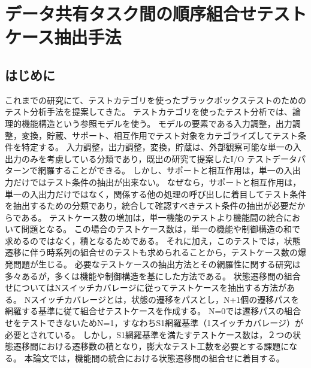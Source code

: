 \documentclass[a4paper,10pt]{jreport}
\begin{document}
\section{データ共有タスク間の順序組合せテストケース抽出手法}

\subsection{はじめに}
これまでの研究にて、テストカテゴリを使ったブラックボックステストのためのテスト分析手法を提案してきた。
テストカテゴリを使ったテスト分析では、論理的機能構造という参照モデルを使う。
モデルの要素である入力調整，出力調整，変換，貯蔵、サポート、相互作用でテスト対象をカテゴライズしてテスト条件を特定する。
入力調整，出力調整，変換，貯蔵は、外部観察可能な単一の入出力のみを考慮している分類であり，既出の研究て提案したI/O テストデータパターンで網羅することができる。
しかし、サポートと相互作用は，単一の入出力だけではテスト条件の抽出が出来ない。
なぜなら，サポートと相互作用は，単一の入出力だけではなく，関係する他の処理の呼び出しに着目してテスト条件を抽出するための分類であり，統合して確認すべきテスト条件の抽出が必要だからである。
テストケース数の増加は，単一機能のテストより機能間の統合において問題となる。
この場合のテストケース数は，単一の機能や制御構造の和で求めるのではなく，積となるためである。
それに加え，このテストでは，状態遷移に伴う時系列の組合せのテストも求められることから，テストケース数の爆発問題が生じる。
必要なテストケースの抽出方法とその網羅性に関する研究は多々あるが，多くは機能や制御構造を基にした方法である\cite{Myers,Lee,Grinda,Ostrand}。
状態遷移間の組合せについてはNスイッチカバレージに従ってテストケースを抽出する方法がある。
Nスイッチカバレージとは，状態の遷移をパスとし，N+1個の遷移パスを網羅する基準に従て組合せテストケースを作成する。
N=0では遷移パスの組合せをテストできないためN=1，すなわちS1網羅基準（1スイッチカバレージ）が必要とされている\cite{Beizer}。
しかし，S1網羅基準を満たすテストケース数は，２つの状態遷移間における遷移数の積となり，膨大なテスト工数を必要とする課題になる。
本論文では，機能間の統合における状態遷移間の組合せに着目する。
\end{document}
